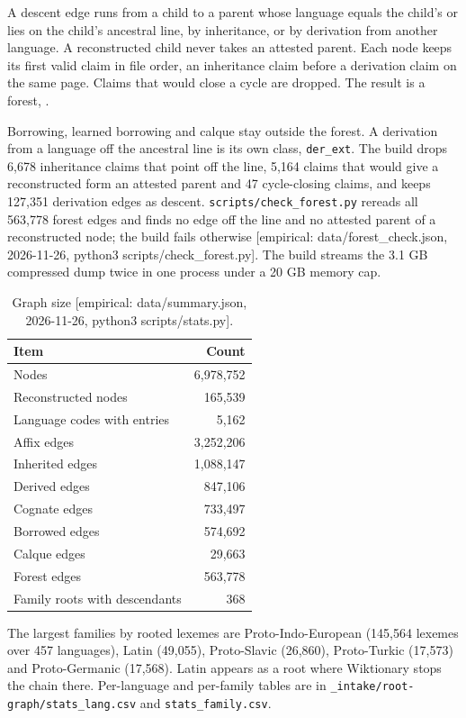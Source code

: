 \documentclass[11pt]{article}
\newcommand{\emp}[1]{{\small[empirical: #1]}}
\newcommand{\sumrun}{data/summary.json, 2026-11-26, python3 scripts/stats.py}
\newcommand{\checkrun}{data/forest\_check.json, 2026-11-26, python3 scripts/check\_forest.py}
\begin{document}
\begin{definition}
\label{def:forest}
A descent edge runs from a child to a parent whose language equals the
child's or lies on the child's ancestral line, by inheritance, or by
derivation from another language. A reconstructed child never takes an
attested parent. Each node keeps its first valid claim in file order, an
inheritance claim before a derivation claim on the same page. Claims that
would close a cycle are dropped. The result is a forest,
.
\end{definition}

Borrowing, learned borrowing and calque stay outside the forest. A
derivation from a language off the ancestral line is its own class,
\texttt{der\_ext}. The build drops 6,678 inheritance claims that point off
the line, 5,164 claims that would give a reconstructed form an attested
parent and 47 cycle-closing claims, and keeps 127,351 derivation edges as
descent. \texttt{scripts/check\_forest.py} rereads all 563,778 forest
edges and finds no edge off the line and no attested parent of a
reconstructed node; the build fails otherwise \emp{\checkrun}. The build
streams the 3.1 GB compressed dump twice in one process under a 20 GB
memory cap.

\begin{table}[htbp]
  \centering
  \caption{Graph size \emp{\sumrun}.}
  \label{tab:graph}
  \begin{tabular}{@{}lr@{}}
    \toprule
    Item & Count \\
    \midrule
    Nodes & 6,978,752 \\
    Reconstructed nodes & 165,539 \\
    Language codes with entries & 5,162 \\
    Affix edges & 3,252,206 \\
    Inherited edges & 1,088,147 \\
    Derived edges & 847,106 \\
    Cognate edges & 733,497 \\
    Borrowed edges & 574,692 \\
    Calque edges & 29,663 \\
    Forest edges & 563,778 \\
    Family roots with descendants & 368 \\
    \bottomrule
  \end{tabular}
\end{table}

The largest families by rooted lexemes are Proto-Indo-European (145,564
lexemes over 457 languages), Latin (49,055), Proto-Slavic (26,860),
Proto-Turkic (17,573) and Proto-Germanic (17,568). Latin appears as a root
where Wiktionary stops the chain there. Per-language and per-family
tables are in \texttt{\_intake/root-graph/stats\_lang.csv} and
\texttt{stats\_family.csv}.
\end{document}
